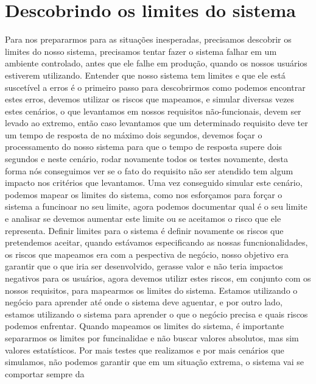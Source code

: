     \section{Descobrindo os limites do sistema}
      Para nos prepararmos para as situações inesperadas, precisamos descobrir os
      limites do nosso sistema, precisamos tentar fazer o sistema falhar em um
      ambiente controlado, antes que ele falhe em produção, quando os nossos usuários
      estiverem utilizando. Entender que nosso sistema tem limites e que ele está
      suscetível a erros é o primeiro passo para descobrirmos como podemos encontrar
      estes erros, devemos utilizar os riscos que mapeamos, e simular diversas vezes
      estes cenários, o que levantamos em nossos requisitos não-funcionais, devem
      ser levado ao extremo, então caso levantamos que um determinado requisito
      deve ter um tempo de resposta de no máximo dois segundos, devemos foçar o
      processamento do nosso sistema para que o tempo de resposta supere dois segundos
      e neste cenário, rodar novamente todos os testes novamente, desta forma nós
      conseguimos ver se o fato do requisito não ser atendido tem algum impacto nos
      critérios que levantamos. Uma vez conseguido simular este cenário, podemos
      mapear os limites do sistema, como nos esforçamos para forçar o sistema a
      funcinoar no seu limite, agora podemos documentar qual é o seu limite e
      analisar se devemos aumentar este limite ou se aceitamos o risco que ele
      representa. \newline
      Definir limites para o sistema é definir novamente os riscos que pretendemos
      aceitar, quando estávamos especificando as nossas funcnionalidades, os riscos
      que mapeamos era com a pespectiva de negócio, nosso objetivo era garantir que
      o que iria ser desenvolvido, gerasse valor e não teria impactos negativos para
      os usuários, agora devemos utilizr estes riscos, em conjunto com os nossos
      requisitos, para mapearmos os limites do sistema. Estamos utilizando o negócio
      para aprender até onde o sistema deve aguentar, e por outro lado, estamos
      utilizando o sistema para aprender o que o negócio precisa e quais riscos
      podemos enfrentar. \newline
      Quando mapeamos os limites do sistema, é importante separarmos os limites por
      funcinalidae e não buscar valores absolutos, mas sim valores estatísticos.
      Por mais testes que realizamos e por mais cenários que simulamos, não podemos
      garantir que em um situação extrema, o sistema vai se comportar sempre da
